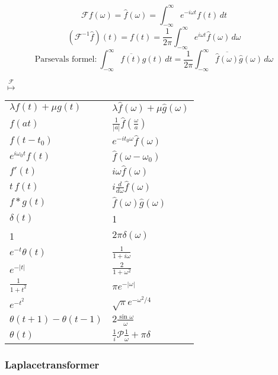 \documentclass{article}
\begin{document}
\[
 \mathcal F f(\omega) = \hat f(\omega) = \int_{-\infty}^\infty e^{-i\omega t} f(t)\, dt
\]
\[
(\mathcal F^{-1}\hat f) (t) = f(t) = \frac 1{2\pi} \int_{-\infty}^\infty e^{i\omega t} \hat f(\omega)\, d\omega
\]
\[
\mbox{Parsevals formel:}\ \int_{-\infty}^\infty \overline{f(t)} g(t)\, dt = \frac{1}{2\pi} \int_{-\infty}^\infty \overline{\hat f(\omega)} \hat g(\omega)\, d\omega
\]
\newpage
\begin{center}
{\Large $\stackrel{\mathcal F}{\longmapsto}$}\\
\begin{tabular}{l|l}
\hline
$\lambda f(t) + \mu g(t)$ & $\lambda \hat f(\omega) + \mu \hat g(\omega)$ \\
$f(at)$ & $\frac 1{|a|} \hat f\left(\frac\omega a\right)$ \\
$f(t-t_0)$ & $e^{-it_0\omega} \hat f(\omega)$ \\
$e^{i\omega_0 t} f(t)$ & $\hat f (\omega - \omega_0)$ \\
$f'(t)$ & $i\omega \hat f(\omega)$ \\
$t\, f(t)$ & $i \frac{d}{d\omega}\hat f(\omega)$ \\
$f*g(t)$ & $\hat f(\omega) \hat g(\omega) $ \\
\hline
$\delta(t)$ & 1 \\
1 & $2\pi \delta(\omega)$ \\
$e^{-t} \theta(t)$ & $\frac{1}{1+i\omega}$ \\
$e^{-|t|}$ & $\frac{2}{1+\omega^2}$ \\
$\frac 1{1+t^2}$ & $\pi e^{-|\omega|}$ \\
$e^{-t^2}$ & $\sqrt\pi e^{-\omega^2/4}$ \\
$\theta(t+1) - \theta(t-1)$ & $2\frac{\sin\omega}\omega$ \\
$\theta(t)$ & $\frac 1i \mathcal P \frac 1\omega + \pi \delta$ \\
\hline
\end{tabular}
\end{center}

\subsubsection*{Laplacetransformer}
\end{document}
